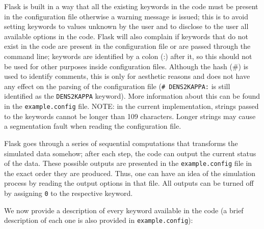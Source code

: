 \documentclass[12pt]{book} %
\begin{document}
{\sc Flask} is built in a way that all the existing keywords in the code must be present in the 
configuration file otherwise a warning message is issued; this is to avoid setting keywords to 
values unknown by the user and to disclose to the user all available options in the code. 
{\sc Flask} will also complain if keywords that do not exist in the code are present in the 
configuration file or are passed through the command line; keywords are identified by a colon (:) 
after it, so this should not be used for other purposes inside configuration files. Although 
the hash (\#) is used to identify comments, this is only for aesthetic reasons and does not have 
any effect on the parsing of the configuration file ({\tt \# DENS2KAPPA:} is still identified as 
the {\tt DENS2KAPPA} keyword). More information about this can be found in the {\tt example.config} 
file. 
NOTE: in the current implementation, strings passed to the keywords cannot be longer than 109 
characters. Longer strings may cause a segmentation fault when reading the configuration file. 

{\sc Flask} goes through a series of sequential computations that transforms the simulated data somehow; 
after each step, the code can output the current status of the data. These possible outputs are 
presented in the {\tt example.config} file in the exact order they are produced. Thus, one can 
have an idea of the simulation process by reading the output options in that file. All outputs 
can be turned off by assigning {\tt 0} to the respective keyword.

We now provide a description of every keyword available in the code (a brief description of 
each one is also provided in {\tt example.config}):
\end{document}
